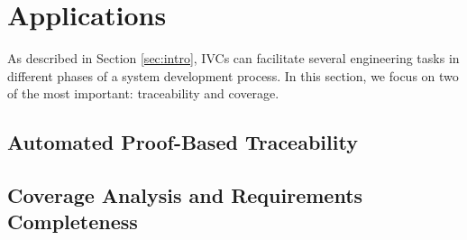 \section{Applications}
\label{sec:apps}
As described in Section \ref{sec:intro}, IVCs can facilitate several engineering tasks in different phases of a system development process.  In this section, we focus on two of the most important: traceability and coverage.

\iffalse
\fi

\subsection{Automated Proof-Based Traceability}



\subsection{Coverage Analysis and Requirements Completeness}






